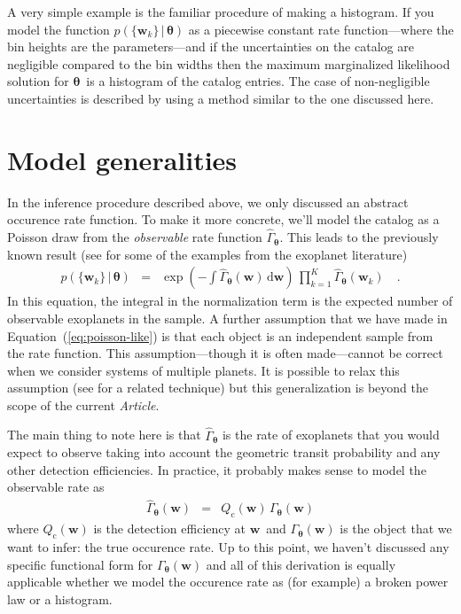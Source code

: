 \documentclass[12pt,preprint]{aastex}
\newcommand{\paper}{\textsl{Article}}
\newcommand{\Eq}[1]{Equation~(\ref{eq:#1})}
\newcommand{\eq}[1]{\Eq{#1}}
\newcommand{\eqlabel}[1]{\label{eq:#1}}
\newcommand{\sectlabel}[1]{\label{sect:#1}}
\newcommand{\dd}{\ensuremath{\,\mathrm{d}}}
\newcommand{\bvec}[1]{\ensuremath{\boldsymbol{#1}}}
\newcommand{\rate}{\ensuremath{\Gamma}}
\newcommand{\ratepar}{{\ensuremath{\theta}}}
\newcommand{\ratepars}{{\ensuremath{\bvec{\ratepar}}}}
\newcommand{\obs}[1]{\ensuremath{\hat{#1}}}
\newcommand{\completeness}{{\ensuremath{Q_\mathrm{c}}}}
\newcommand{\entry}{{\ensuremath{\bvec{w}}}}
\begin{document}
A very simple example is the familiar procedure of making a histogram.
If you model the function $p(\{\entry_k\}\,|\,\ratepars)$ as a piecewise
constant rate function---where the bin heights are the parameters---and if the
uncertainties on the catalog are negligible compared to the bin widths then
the maximum marginalized likelihood solution for \ratepars\ is a histogram of
the catalog entries.
The case of non-negligible uncertainties is described by \citet{hogge} using a
method similar to the one discussed here.

\section{Model generalities}
\sectlabel{model}

In the inference procedure described above, we only discussed an abstract
occurence rate function.
To make it more concrete, we'll model the catalog as a Poisson draw from the
\emph{observable} rate function $\obs{\rate}_\ratepars$.
This leads to the previously known result (see \citealt{tabachnik,youdin} for
some of the examples from the exoplanet literature)
\begin{eqnarray}\eqlabel{poisson-like}
p(\{\entry_k\}\,|\,\ratepars) &=&
    \exp\left(-\int \obs{\rate}_\ratepars (\entry) \dd\entry\right) \,
    \prod_{k=1}^K \obs{\rate}_\ratepars (\entry_k)\quad.
\end{eqnarray}
In this equation, the integral in the normalization term is the expected
number of observable exoplanets in the sample.
A further assumption that we have made in \eq{poisson-like} is that each
object is an independent sample from the rate function.
This assumption---though it is often made---cannot be correct when we consider
systems of multiple planets.
It is possible to relax this assumption (see \citealt{tremaine} for a related
technique) but this generalization is beyond the scope of the current \paper.

The main thing to note here is that $\obs{\rate}_\ratepars$ is the rate of
exoplanets that you would expect to observe taking into account the geometric
transit probability and any other detection efficiencies.
In practice, it probably makes sense to model the observable rate as
\begin{eqnarray}
\obs{\rate}_\ratepars(\entry) &=&
    \completeness(\entry)\,\rate_\ratepars(\entry)
\end{eqnarray}
where $\completeness(\entry)$ is the detection efficiency at \entry\ and
$\rate_\ratepars(\entry)$ is the object that we want to infer: the true
occurence rate.
Up to this point, we haven't discussed any specific functional form for
$\rate_\ratepars(\entry)$ and all of this derivation is equally applicable
whether we model the occurence rate as (for example) a broken power law or
a histogram.
\end{document}
